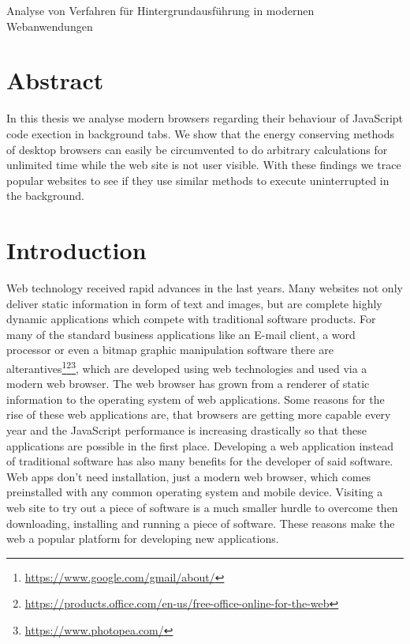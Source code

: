 \documentclass[article,type=bsc,colorback,accentcolor=tud9c]{tudthesis}
\begin{document}
    {Analyse von Verfahren für Hintergrundausführung in modernen Webanwendungen}
  \author{Yannick Reifschneider}
  \dateofexam{\today}{\today}
  \makethesistitle

  \tableofcontents

  \newpage
  \section{Abstract}

  In this thesis we analyse modern browsers regarding their behaviour of JavaScript code exection in background tabs. We show that the energy conserving methods of desktop browsers can easily be circumvented to do arbitrary calculations for unlimited time while the web site is not user visible. With these findings we trace popular websites to see if they use similar methods to execute uninterrupted in the background.

  \newpage
  \section{Introduction}

  Web technology received rapid advances in the last years. Many websites not only deliver static information in form of text and images, but are complete highly dynamic applications which compete with traditional software products. For many of the standard business applications like an E-mail client, a word processor or even a bitmap graphic manipulation software there are alterantives\footnote{\url{https://www.google.com/gmail/about/}}\footnote{\url{https://products.office.com/en-us/free-office-online-for-the-web}}\footnote{\url{https://www.photopea.com/}}, which are developed using web technologies and used via a modern web browser. The web browser has grown from a renderer of static information to the operating system of web applications. Some reasons for the rise of these web applications are, that browsers are getting more capable every year and the JavaScript performance is increasing drastically so that these applications are possible in the first place. Developing a web application instead of traditional software has also many benefits for the developer of said software. Web apps don't need installation, just a modern web browser, which comes preinstalled with any common operating system and mobile device. Visiting a web site to try out a piece of software is a much smaller hurdle to overcome then downloading, installing and running a piece of software. These reasons make the web a popular platform for developing new applications.
\end{document}

